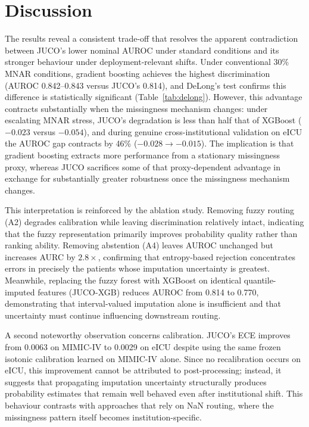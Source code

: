 \documentclass[journal]{IEEEtran}
\begin{document}
	
	\section{Discussion}
	\label{sec:discussion}
	
	\label{sec:auroc_gap}
	The results reveal a consistent trade-off that resolves the apparent contradiction between JUCO's lower nominal AUROC under standard conditions and its stronger behaviour under deployment-relevant shifts. Under conventional 30\% MNAR conditions, gradient boosting achieves the highest discrimination (AUROC 0.842--0.843 versus JUCO's 0.814), and DeLong's test confirms this difference is statistically significant (Table~\ref{tab:delong}). However, this advantage contracts substantially when the missingness mechanism changes: under escalating MNAR stress, JUCO's degradation is less than half that of XGBoost ($-0.023$ versus $-0.054$), and during genuine cross-institutional validation on eICU the AUROC gap contracts by 46\% ($-0.028 \rightarrow -0.015$). The implication is that gradient boosting extracts more performance from a stationary missingness proxy, whereas JUCO sacrifices some of that proxy-dependent advantage in exchange for substantially greater robustness once the missingness mechanism changes.
	
	This interpretation is reinforced by the ablation study. Removing fuzzy routing (A2) degrades calibration while leaving discrimination relatively intact, indicating that the fuzzy representation primarily improves probability quality rather than ranking ability. Removing abstention (A4) leaves AUROC unchanged but increases AURC by $2.8\times$, confirming that entropy-based rejection concentrates errors in precisely the patients whose imputation uncertainty is greatest. Meanwhile, replacing the fuzzy forest with XGBoost on identical quantile-imputed features (JUCO-XGB) reduces AUROC from 0.814 to 0.770, demonstrating that interval-valued imputation alone is insufficient and that uncertainty must continue influencing downstream routing.
	
	A second noteworthy observation concerns calibration. JUCO's ECE improves from 0.0063 on MIMIC-IV to 0.0029 on eICU despite using the same frozen isotonic calibration learned on MIMIC-IV alone. Since no recalibration occurs on eICU, this improvement cannot be attributed to post-processing; instead, it suggests that propagating imputation uncertainty structurally produces probability estimates that remain well behaved even after institutional shift. This behaviour contrasts with approaches that rely on NaN routing, where the missingness pattern itself becomes institution-specific.
	
\end{document}
